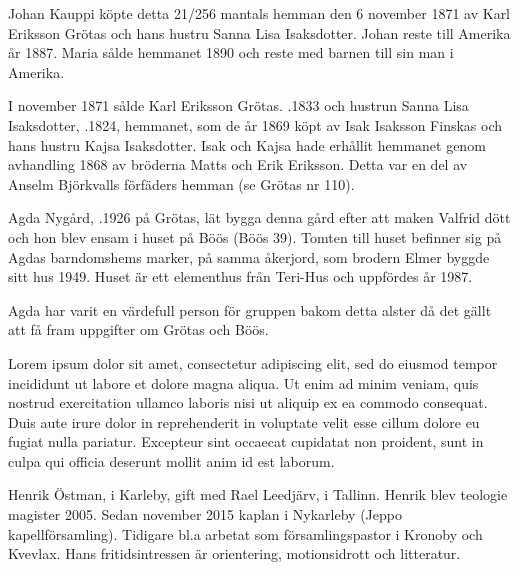 Johan Kauppi köpte detta 21/256 mantals hemman den 6 november 1871 av Karl Eriksson Grötas och hans hustru Sanna Lisa Isaksdotter. Johan reste till Amerika år 1887. Maria sålde hemmanet 1890 och reste med barnen till sin man i Amerika.


I november 1871 sålde Karl Eriksson Grötas. .1833 och hustrun Sanna Lisa Isaksdotter, .1824, hemmanet, som de år 1869 köpt av Isak Isaksson Finskas och hans hustru Kajsa Isaksdotter. Isak och Kajsa hade erhållit hemmanet genom avhandling 1868 av bröderna Matts och Erik Eriksson. Detta var en del av Anselm Björkvalls förfäders hemman (se Grötas nr 110).






Agda Nygård, .1926 på Grötas, lät bygga denna gård efter att maken Valfrid dött och hon blev ensam i huset på Böös (Böös 39). Tomten till huset befinner sig på Agdas barndomshems marker, på samma åkerjord, som brodern Elmer byggde sitt hus 1949. Huset är ett elementhus från Teri-Hus och uppfördes år 1987.

Agda har varit en värdefull person för gruppen bakom detta alster då det gällt att få fram uppgifter om Grötas och Böös.

Lorem ipsum dolor sit amet, consectetur adipiscing elit, sed do eiusmod tempor incididunt ut labore et dolore magna aliqua. Ut enim ad minim veniam, quis nostrud exercitation ullamco laboris nisi ut aliquip ex ea commodo consequat. Duis aute irure dolor in reprehenderit in voluptate velit esse cillum dolore eu fugiat nulla pariatur. Excepteur sint occaecat cupidatat non proident, sunt in culpa qui officia deserunt mollit anim id est laborum. %





Henrik Östman,  i Karleby, gift med Rael Leedjärv,   i Tallinn. Henrik blev teologie magister 2005. Sedan november 2015 kaplan i Nykarleby (Jeppo kapellförsamling). Tidigare bl.a arbetat som församlingspastor i Kronoby och Kvevlax. Hans fritidsintressen är orientering, motionsidrott och litteratur.

